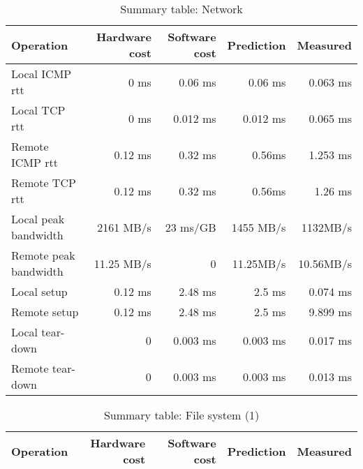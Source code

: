 \begin{table}[h]
\begin{center}
\begin{tabular}{| l | r | r | r | r |} \hline
Operation 			& Hardware cost 	& Software cost 	& Prediction	& Measured \\ \hline

Local ICMP rtt	& 0 ms	& 0.06 ms & 0.06 ms  & 0.063 ms	\\ \hline
Local TCP rtt	& 0 ms	& 0.012 ms & 0.012 ms	& 0.065 ms\\ \hline
Remote ICMP rtt	& 0.12 ms	& 0.32 ms & 0.56ms  & 1.253 ms\\ \hline
Remote TCP rtt	& 0.12 ms	& 0.32 ms & 0.56ms  & 1.26 ms	\\ \hline\hline


Local peak bandwidth	&  2161 MB/s	& 23 ms/GB	&  1455 MB/s &  1132MB/s \\
\hline
Remote peak bandwidth 	&  11.25 MB/s	& 0 &  11.25MB/s	&  10.56MB/s \\
\hline\hline


Local setup 	&  0.12 ms	& 2.48 ms	&  2.5 ms & 0.074 ms \\ \hline
Remote setup	&  0.12 ms	& 2.48 ms	&  2.5 ms&  9.899 ms \\ \hline
Local tear-down 	&  0	& 0.003 ms	&  0.003 ms&  0.017 ms \\ \hline
Remote tear-down	&  0	& 0.003 ms	&  0.003 ms&  0.013 ms \\ \hline





\end{tabular}
\end{center}

\caption{Summary table: Network}

\end{table}












\begin{table}[h]
\begin{center}
\begin{tabular}{| l | r | r | r | r |} \hline
Operation 			& Hardware cost 	& Software cost 	& Prediction	& Measured \\ \hline











\end{tabular}
\end{center}

\caption{Summary table: File system (1)}

\end{table}



